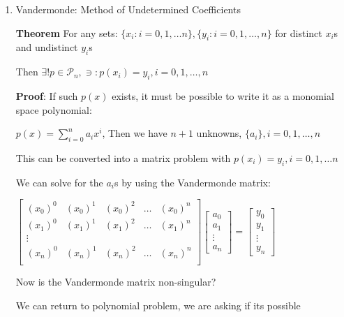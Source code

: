 \documentclass{article}
\begin{document}
\begin{enumerate}
    \item Vandermonde: Method of Undetermined Coefficients
    
    \textbf{Theorem} For any sets: $\{x_i: i = 0, 1, \dots n\}, \{y_i: i = 0, 1, \dots ,n\}$ for distinct $x_i$s and undistinct $y_i$s
    
    Then $\exists ! p \in \mathcal{P}_n, \ni: p(x_i) = y_i, i = 0, 1, \dots ,n$
    
    \vspace{0.2cm}
    
    \textbf{Proof}: If such $p(x)$ exists, it must be possible to write it as a monomial space polynomial: 
    
    $p(x) = \displaystyle \sum_{i = 0}^n a_i x^i$, Then we have $n + 1$ unknowns, $\{ a_i \}, i = 0, 1, \dots ,n$
    
    \pagebreak
    
    \text{}
    
    This can be converted into a matrix problem with $p(x_i) = y_i, i = 0, 1, \dots n$
    
    We can solve for the $a_i$s by using the Vandermonde matrix:
    
    \hspace{6cm} $\begin{bmatrix}
    (x_0)^0 & (x_0)^1 & (x_0)^2 & \dots & (x_0)^n\\
    (x_1)^0 & (x_1)^1 & (x_1)^2 & \dots & (x_1)^n\\
     \vdots &  &  &  &  \\
     (x_n)^0 & (x_n)^1 & (x_n)^2 & \dots & (x_n)^n\\
    \end{bmatrix}\begin{bmatrix}
    a_0\\
    a_1\\
    \vdots\\
    a_n
    \end{bmatrix} = \begin{bmatrix}
    y_0\\
    y_1\\
    \vdots\\
    y_n
    \end{bmatrix}$
    
    \vspace{0.2cm}
    
    Now is the Vandermonde matrix non-singular? 
    
    We can return to polynomial problem, we are asking if its possible 
    

\end{enumerate}
\end{document}

